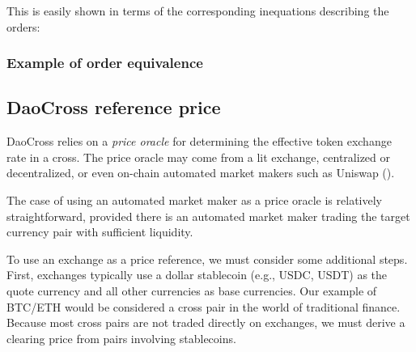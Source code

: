\documentclass[11pt, reqno]{amsart}
\begin{document}
This is easily shown in terms of the corresponding inequations describing the orders:

%
%
%

\subsubsection{Example of order equivalence}
%
%


\subsection{DaoCross reference price}
DaoCross relies on a \emph{price oracle} for determining the effective
token exchange rate in a cross. The price oracle may come from a lit
exchange, centralized or decentralized, or even on-chain automated market
makers such as Uniswap (\cite[\S 2.2]{AdZiRo20}).

The case of using an automated market maker as a price oracle is relatively
straightforward, provided there is an automated market maker trading the
target currency pair with sufficient liquidity.

To use an exchange as a price reference, we must consider some additional
steps. First, exchanges typically use a dollar stablecoin (e.g., USDC, USDT) as
the quote currency and all other currencies as base currencies. Our example
of BTC/ETH would be considered a cross pair in the world of traditional
finance. Because most cross pairs are not traded directly on exchanges, we
must derive a clearing price from pairs involving stablecoins.
\end{document}
